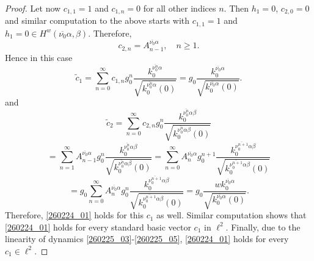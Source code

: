 \documentclass[reqno,11pt,centertags]{article}
\theoremstyle{definition}
\def\a{\alpha}
\def\b{\beta}
\begin{document}
\begin{proof}
Let now $c_{1,1}=1$ and $c_{1,n}=0$ for all other indices $n$. Then $h_1=0$, $c_{2,0}=0$ and
similar computation to the above starts with $c_{1,1}=1$ and $h_1=0\in H^w(\overline{\nu_0}\a, \b)$.
Therefore,
$$
c_{2,n}=A^{\overline{\nu_0}\a}_{n-1}, \quad n\ge 1 .
$$
Hence in this case
$$
\widetilde c_1=
\sum\limits_{n=0}^\infty
c_{1,n}
g^n_0\dfrac{k^{\overline{\nu_0^{n}}\a}_0}{\sqrt{k^{\overline{\nu_0^{n}}\a}_0(0)}}
=
g_0\dfrac{k^{\overline{\nu_0}\a}_0}{\sqrt{k^{\overline{\nu_0}\a}_0(0)}}.
$$
and
$$
\widetilde c_2
=
\sum\limits_{n=0}^\infty
c_{2,n}
g^n_0\dfrac{k^{\overline{\nu_0^{n}}\a\b}_0}{\sqrt{k^{\overline{\nu_0^{n}}\a\b}_0(0)}}
$$
$$
=
\sum\limits_{n=1}^\infty
A^{\overline{\nu_0}\a}_{n-1}
g^n_0\dfrac{k^{\overline{\nu_0^{n}}\a\b}_0}{\sqrt{k^{\overline{\nu_0^{n}}\a\b}_0(0)}}
=
\sum\limits_{n=0}^\infty
A^{\overline{\nu_0}\a}_{n}
g^{n+1}_0\dfrac{k^{\overline{\nu_0^{n+1}}\a\b}_0}{\sqrt{k^{\overline{\nu_0^{n+1}}\a\b}_0(0)}}
$$
$$
=
g_0\sum\limits_{n=0}^\infty
A^{\overline{\nu_0}\a}_{n}
g^{n}_0\dfrac{k^{\overline{\nu_0^{n+1}}\a\b}_0}{\sqrt{k^{\overline{\nu_0^{n+1}}\a\b}_0(0)}}
=
g_0
\dfrac{wk^{\overline{\nu_0}\a}_0}{\sqrt{k^{\overline{\nu_0}\a}_0(0)}}.
$$
Therefore, \eqref{260224_01} holds for this $c_1$ as well. Similar computation shows that
\eqref{260224_01} holds for every standard basic vector $c_1$ in $\ell^2$. Finally, due to the linearity of
dynamics \eqref{260225_03}-\eqref{260225_05},
\eqref{260224_01} holds for every $c_1\in\ell^2$.
\end{proof}



\end{document}
